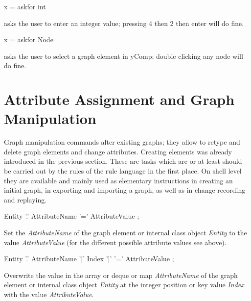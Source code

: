 \begin{example}
\begin{grshelllet}
x = askfor int
\end{grshelllet}
asks the user to enter an integer value; pressing 4 then 2 then enter will do fine.
\begin{grshelllet}
x = askfor Node
\end{grshelllet}
asks the user to select a graph element in yComp; double clicking any node will do fine.
\end{example}


\section{Attribute Assignment and Graph Manipulation}
\label{mani}
Graph manipulation commands alter existing graphs;
they allow to retype and delete graph elements and change attributes.
Creating elements was already introduced in the previous section.
These are tasks which are or at least should be carried out by the rules of the rule language in the first place.
On shell level they are available and mainly used as elementary instructions in creating an initial graph, in exporting and importing a graph, as well as in change recording and replaying.

\begin{rail}
  Entity '.' AttributeName '=' AttributeValue ;
\end{rail}
Set the  \emph{AttributeName} of the graph element or internal class object \emph{Entity} to the value \emph{AttributeValue} (for the different possible attribute values see above).

\begin{rail}
  Entity '.' AttributeName '[' Index ']' '=' AttributeValue ;
\end{rail}
Overwrite the value in the array or deque or map  \emph{AttributeName} of the graph element or internal class object \emph{Entity} at the integer position or key value \emph{Index} with the value \emph{AttributeValue}.

